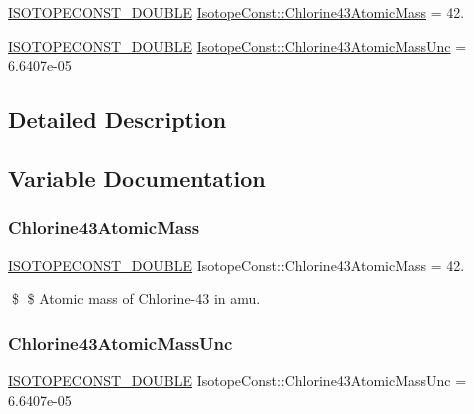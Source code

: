 \begin{DoxyCompactItemize}
\item 
\mbox{\hyperlink{group___isotope_const-_macros_ga8f45a7272ce02c0b4c65c44636ed719a}{I\+S\+O\+T\+O\+P\+E\+C\+O\+N\+S\+T\+\_\+\+D\+O\+U\+B\+LE}} \mbox{\hyperlink{group___isotope_const-_chlorine-_cl43_ga113caad89cbf3b3e914f89cc355fd65c}{Isotope\+Const\+::\+Chlorine43\+Atomic\+Mass}} = 42.
\item 
\mbox{\hyperlink{group___isotope_const-_macros_ga8f45a7272ce02c0b4c65c44636ed719a}{I\+S\+O\+T\+O\+P\+E\+C\+O\+N\+S\+T\+\_\+\+D\+O\+U\+B\+LE}} \mbox{\hyperlink{group___isotope_const-_chlorine-_cl43_ga70ae52489fe4ec07fffaf3ef861be5c2}{Isotope\+Const\+::\+Chlorine43\+Atomic\+Mass\+Unc}} = 6.\+6407e-\/05
\end{DoxyCompactItemize}


\subsection{Detailed Description}


\subsection{Variable Documentation}
\mbox{\label{group___isotope_const-_chlorine-_cl43_ga113caad89cbf3b3e914f89cc355fd65c}} 
\subsubsection{\texorpdfstring{Chlorine43\+Atomic\+Mass}{Chlorine43AtomicMass}}
{\footnotesize\ttfamily \mbox{\hyperlink{group___isotope_const-_macros_ga8f45a7272ce02c0b4c65c44636ed719a}{I\+S\+O\+T\+O\+P\+E\+C\+O\+N\+S\+T\+\_\+\+D\+O\+U\+B\+LE}} Isotope\+Const\+::\+Chlorine43\+Atomic\+Mass = 42.}

\$ \$ Atomic mass of Chlorine-\/43 in amu. \mbox{\label{group___isotope_const-_chlorine-_cl43_ga70ae52489fe4ec07fffaf3ef861be5c2}} 
\subsubsection{\texorpdfstring{Chlorine43\+Atomic\+Mass\+Unc}{Chlorine43AtomicMassUnc}}
{\footnotesize\ttfamily \mbox{\hyperlink{group___isotope_const-_macros_ga8f45a7272ce02c0b4c65c44636ed719a}{I\+S\+O\+T\+O\+P\+E\+C\+O\+N\+S\+T\+\_\+\+D\+O\+U\+B\+LE}} Isotope\+Const\+::\+Chlorine43\+Atomic\+Mass\+Unc = 6.\+6407e-\/05}

